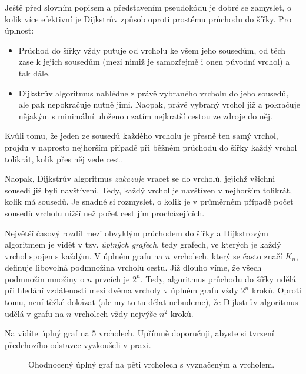 Ještě před slovním popisem a představením pseudokódu je dobré se zamyslet, o
kolik více efektivní je Dijkstrův způsob oproti prostému průchodu do šířky. Pro
úplnost:
\begin{itemize}
 \item Průchod do šířky vždy putuje od vrcholu ke všem jeho sousedům, od těch
  zase k jejich sousedům (mezi nimiž je samozřejmě i onen původní vrchol) a tak
  dále.
 \item Dijkstrův algoritmus nahlédne z právě vybraného vrcholu do jeho sousedů,
  ale pak nepokračuje nutně jimi. Naopak, právě vybraný vrchol již 
  a pokračuje nějakým s minimální uloženou zatím nejkratší cestou ze zdroje do
  něj.
\end{itemize}
Kvůli tomu, že jeden ze sousedů každého vrcholu je přesně ten samý vrchol,
projdu v naprosto nejhorším případě při běžném průchodu do šířky každý vrchol
tolikrát, kolik přes něj vede cest.

Naopak, Dijkstrův algoritmus \emph{zakazuje} vracet se do vrcholů, jejichž
všichni sousedi již byli navštíveni. Tedy, každý vrchol je navštíven v nejhorším
tolikrát, kolik má sousedů. Je snadné si rozmyslet, o kolik je v průměrném
případě počet sousedů vrcholu nižší než počet cest jím procházejících.

Největší časový rozdíl mezi obvyklým průchodem do šířky a Dijkstrovým algoritmem
je vidět v tzv. \emph{úplných grafech}, tedy grafech, ve kterých je každý vrchol
spojen s každým. V úplném grafu na $n$ vrcholech, který se často značí $K_n$,
definuje libovolná podmnožina vrcholů cestu. Již dlouho víme, že všech podmnožin
množiny o $n$ prvcích je $2^{n}$. Tedy, algoritmus průchodu do šířky udělá při
hledání vzdálenosti mezi dvěma vrcholy v úplném grafu vždy $2^{n}$ kroků. Oproti
tomu, není těžké dokázat (ale my to tu dělat nebudeme), že Dijkstrův algoritmus
udělá v grafu na $n$ vrcholech vždy nejvýše $n^2$ kroků.

Na  vidíte úplný graf na $5$ vrcholech. Upřímně
doporučuji, abyste si tvrzení předchozího odstavce vyzkoušeli v praxi.

\begin{figure}[h]
 \centering

 \caption{Ohodnocený úplný graf na pěti vrcholech s vyznačeným  a
  vrcholem.}
 \label{fig:uplny-graf}
\end{figure}

